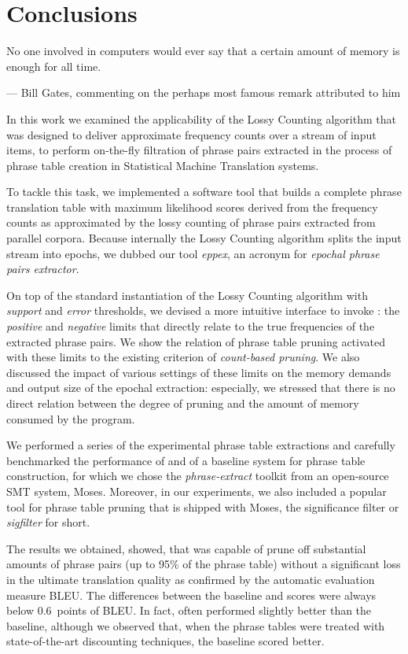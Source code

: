 \chapter{Conclusions}
\label{chap:conclusions}

\setlength{\epigraphwidth}{1.0\textwidth}
\epigraph{No one involved in computers would ever say that a certain amount of memory is enough for all time.}{--- Bill Gates, commenting on the perhaps most famous remark attributed to him}

In this work we examined the applicability of the Lossy Counting algorithm
that was designed to deliver approximate frequency counts over a stream of
input items, to perform on-the-fly filtration of phrase pairs extracted in
the process of phrase table creation in Statistical Machine Translation systems.

To tackle this task, we implemented a software tool that builds a complete phrase
translation table with maximum likelihood scores derived from the frequency
counts as approximated by the lossy counting of phrase pairs extracted from
parallel corpora.
Because internally the Lossy Counting algorithm splits the input stream into
epochs, we dubbed our tool \emph{eppex}, an acronym for \emph{epochal phrase
pairs extractor}.

On top of the standard instantiation of the Lossy Counting algorithm with
\emph{support} and \emph{error} thresholds, we devised a more intuitive interface
to invoke \eppex{}: the \emph{positive} and \emph{negative} limits that
directly relate to the true frequencies of the extracted phrase pairs.
We show the relation of phrase table pruning activated with these limits
to the existing criterion of \emph{count-based pruning}.
We also discussed the impact of various settings of these limits on the memory
demands and output size of the epochal extraction: especially, we stressed
that there is no direct relation between the degree of pruning and the amount
of memory consumed by the program.

We performed a series of the experimental phrase table extractions and carefully
benchmarked the performance of \eppex{} and of a baseline system for phrase
table construction, for which we chose the \emph{phrase-extract} toolkit from
an open-source SMT system, Moses.
Moreover, in our experiments, we also included a popular tool for phrase table
pruning that is shipped with Moses, the significance filter or \emph{sigfilter}
for short.

The results we obtained, showed, that \eppex{} was capable of prune off
substantial amounts of phrase pairs (up to 95\% of the phrase table) without
a significant loss in the ultimate translation quality as confirmed by the
automatic evaluation measure BLEU.
The differences between the baseline and \eppex{} scores were always below
0.6~points of BLEU.
In fact, \eppex{} often performed slightly better than the baseline,
although we observed that, when the phrase tables were treated with
state-of-the-art discounting techniques, the baseline scored better.

